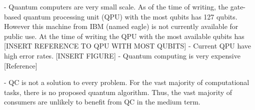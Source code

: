 - Quantum computers are very small scale. As of the time of writing, the gate-based quantum processing unit (QPU) with the most qubits has 127 qubits. However this machine from IBM (named eagle) is not currently available for public use. At the time of writing the QPU with the most available qubits has [INSERT REFERENCE TO QPU WITH MOST QUBITS]
- Current QPU have high error rates. [INSERT FIGURE]
- Quantum computing is very expensive [Reference]

- QC is not a solution to every problem. For the vast majority of computational tasks, there is no proposed quantum algorithm. Thus, the vast majority of consumers are unlikely to benefit from QC in the medium term.

